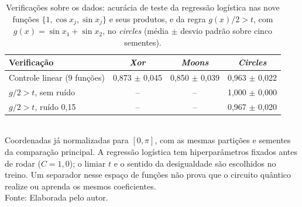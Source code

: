 \begin{table}[htb]
\centering
\caption[Verificações independentes do treinamento quântico]{Verificações sobre os dados: acurácia de teste da regressão logística nas nove funções $\{1, \cos x_j, \sin x_j\}$ e seus produtos, e da regra $g(x)/2 > t$, com $g(x) = \sin x_1 + \sin x_2$, no \textit{circles} (média $\pm$ desvio padrão sobre cinco sementes).}
\label{tab:verificacoes}
\begin{tabular}{lccc}
\toprule
Verificação & \textit{Xor} & \textit{Moons} & \textit{Circles} \\
\midrule
Controle linear (9 funções) & 0,873 $\pm$ 0,045 & 0,850 $\pm$ 0,039 & 0,963 $\pm$ 0,022 \\
$g/2 > t$, sem ruído & -- & -- & 1,000 $\pm$ 0,000 \\
$g/2 > t$, ruído 0,15 & -- & -- & 0,967 $\pm$ 0,020 \\
\bottomrule
\end{tabular}
\\[2pt]
{\footnotesize Coordenadas já normalizadas para $[0, \pi]$, com as mesmas partições e sementes da comparação principal. A regressão logística tem hiperparâmetros fixados antes de rodar ($C = 1,0$); o limiar $t$ e o sentido da desigualdade são escolhidos no treino. Um separador nesse espaço de funções não prova que o circuito quântico realize ou aprenda os mesmos coeficientes.}
\\[2pt]
{\footnotesize Fonte: Elaborada pelo autor.}
\end{table}
